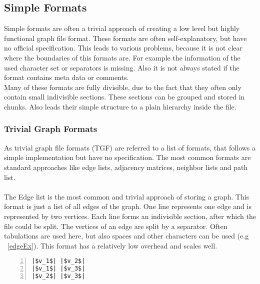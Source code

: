 \newpage
\subsection{Simple Formats}
Simple formats are often a trivial approach of creating a low level but highly functional graph file format. These formats are often self-explanatory, but have no official specification. This leads to various problems, because it is not clear where the boundaries of this formats are. For example the information of the used character set or separators is missing. Also it is not always stated if the format contains meta data or comments\cite{Roughan.10.03.2015}.\\
Many of these formats are fully divisible, due to the fact that they often only contain small indivisible sections. These sections can be grouped and stored in chunks. Also leads their simple structure to a plain hierarchy inside the file.

\subsubsection{Trivial Graph Formats}
As trivial graph file formats (TGF) are referred to a list of formats, that follows a simple implementation but have no specification. The most common formats are standard approaches like edge lists, adjacency matrices, neighbor lists and path list.\\

\\
The Edge list is the most common and trivial approach of storing a graph.
This format is just a list of all edges of the graph.
One line represents one edge and is represented by two vertices. Each line forms an indivisible section, after which the file could be split. The vertices of an edge are split by a separator. Often tabulations are used here, but also spaces and other characters can be used (e.g ~\ref{edgeEx}). This format has a relatively low overhead and scales well.
\vspace{-7mm}
\begin{center}
	\begin{minipage}{.6\textwidth}
\begin{lstlisting}[numbers=left,firstnumber=1,caption={Edge List},captionpos=b,linewidth={\textwidth}, escapeinside=||,label={edgeEx}]
|$v_1$| |$v_2$|
|$v_1$| |$v_3$|
|$v_2$| |$v_3$|
\end{lstlisting}
\end{minipage}
\end{center}


